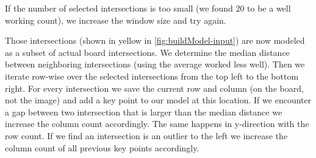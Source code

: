 	If the number of selected intersections is too small (we found 20 to be a well working count), we increase the window size and try again.

	Those intersections (shown in yellow in \autoref{fig:buildModel-input}) are now modeled as a subset of actual board intersections. We determine the median distance between neighboring intersections (using the average worked less well). Then we iterate row-wise over the selected intersections from the top left to the bottom right. For every intersection we save the current row and column (on the board, not the image) and add a key point to our model at this location. If we encounter a gap between two intersection that is larger than the median distance we increase the column count accordingly. The same happens in y-direction with the row count. If we find an intersection is an outlier to the left we increase the column count of all previous key points accordingly.

